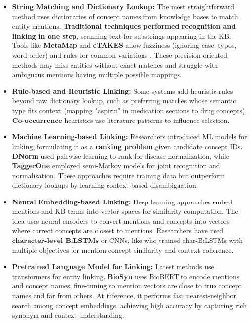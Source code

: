 \begin{itemize}
  \item \textbf{String Matching and Dictionary Lookup:} The most straightforward method uses dictionaries of concept names from knowledge bases to match entity mentions. \textbf{Traditional techniques performed recognition and linking in one step}, scanning text for substrings appearing in the KB. Tools like \textbf{MetaMap} and \textbf{cTAKES} allow fuzziness (ignoring case, typos, word order) and rules for common variations \parencite{Stenetorp2024}. These precision-oriented methods may miss entities without exact matches and struggle with ambiguous mentions having multiple possible mappings.

  \item \textbf{Rule-based and Heuristic Linking:} Some systems add heuristic rules beyond raw dictionary lookup, such as preferring matches whose semantic type fits context (mapping "aspirin" in medication sections to drug concepts). \textbf{Co-occurrence} heuristics use literature patterns to influence selection.

  \item \textbf{Machine Learning-based Linking:} Researchers introduced ML models for linking, formulating it as a \textbf{ranking problem} given candidate concept IDs. \textbf{DNorm} \parencite{Leaman2013} used pairwise learning-to-rank for disease normalization, while \textbf{TaggerOne} \parencite{Leaman2016} employed semi-Markov models for joint recognition and normalization. These approaches require training data but outperform dictionary lookups by learning context-based disambiguation.

  \item \textbf{Neural Embedding-based Linking:} Deep learning approaches embed mentions and KB terms into vector spaces for similarity computation. The idea uses neural encoders to convert mentions and concepts into vectors where correct concepts are closest to mentions. Researchers have used \textbf{character-level BiLSTMs} or CNNs, like \cite{Phan2019} who trained char-BiLSTMs with multiple objectives for mention-concept similarity and context coherence.

  \item \textbf{Pretrained Language Model for Linking:} Latest methods use transformers for entity linking. \textbf{BioSyn} \parencite{Sung2020} uses BioBERT to encode mentions and concept names, fine-tuning so mention vectors are close to true concept names and far from others. At inference, it performs fast nearest-neighbor search among concept embeddings, achieving high accuracy by capturing rich synonym and context understanding.
\end{itemize}

